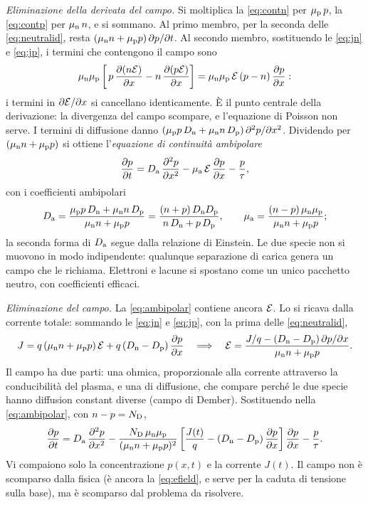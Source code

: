 \documentclass[10pt,a4paper]{scrartcl}
\let\newcommand\pdvaluedefine
\newcommand{\Ef}{\mathcal{E}}                 %
\newcommand{\ND}{N_\mathrm{D}}
\newcommand{\Da}{D_\mathrm{a}}
\newcommand{\Dn}{D_\mathrm{n}}
\newcommand{\Dp}{D_\mathrm{p}}
\newcommand{\mun}{\mu_\mathrm{n}}
\newcommand{\mup}{\mu_\mathrm{p}}
\newcommand{\dpar}[2]{\frac{\partial #1}{\partial #2}}
\newcommand{\dparq}[2]{\frac{\partial^2 #1}{\partial #2^2}}
\begin{document}
\emph{Eliminazione della derivata del campo.} Si moltiplica la \eqref{eq:contn} per $\mup\,p$, la \eqref{eq:contp} per $\mun\,n$, e si sommano. Al primo membro, per la seconda delle \eqref{eq:neutralid}, resta $(\mun n + \mup p)\,\partial p/\partial t$. Al secondo membro, sostituendo le \eqref{eq:jn} e \eqref{eq:jp}, i termini che contengono il campo sono
\begin{equation}
\mun\mup\left[\,p\,\dpar{(n\Ef)}{x} - n\,\dpar{(p\Ef)}{x}\right] = \mun\mup\,\Ef\,(p - n)\,\dpar{p}{x} :
\end{equation}
i termini in $\partial\Ef/\partial x$ si cancellano identicamente. È il punto centrale della derivazione: la divergenza del campo scompare, e l'equazione di Poisson non serve. I termini di diffusione danno $(\mup p\,\Dn + \mun n\,\Dp)\,\partial^2 p/\partial x^2$. Dividendo per $(\mun n + \mup p)$ si ottiene l'\emph{equazione di continuità ambipolare}
\begin{equation}
\dpar{p}{t} = \Da\,\dparq{p}{x} - \mu_\mathrm{a}\,\Ef\,\dpar{p}{x} - \frac{p}{\tau} ,
\label{eq:ambipolar}
\end{equation}
con i coefficienti ambipolari
\begin{equation}
\Da = \frac{\mup p\,\Dn + \mun n\,\Dp}{\mun n + \mup p} = \frac{(n+p)\,\Dn\Dp}{n\,\Dn + p\,\Dp} , \qquad
\mu_\mathrm{a} = \frac{(n-p)\,\mun\mup}{\mun n + \mup p} ;
\label{eq:dacoef}
\end{equation}
la seconda forma di $\Da$ segue dalla relazione di Einstein. Le due specie non si muovono in modo indipendente: qualunque separazione di carica genera un campo che le richiama. Elettroni e lacune si spostano come un unico pacchetto neutro, con coefficienti efficaci.

\emph{Eliminazione del campo.} La \eqref{eq:ambipolar} contiene ancora $\Ef$. Lo si ricava dalla corrente totale: sommando le \eqref{eq:jn} e \eqref{eq:jp}, con la prima delle \eqref{eq:neutralid},
\begin{equation}
J = q\,(\mun n + \mup p)\,\Ef + q\,(\Dn - \Dp)\,\dpar{p}{x}
\quad\Longrightarrow\quad
\Ef = \frac{J/q - (\Dn - \Dp)\,\partial p/\partial x}{\mun n + \mup p} .
\label{eq:efield}
\end{equation}
Il campo ha due parti: una ohmica, proporzionale alla corrente attraverso la conducibilità del plasma, e una di diffusione, che compare perché le due specie hanno diffusion constant diverse (campo di Dember). Sostituendo nella \eqref{eq:ambipolar}, con $n - p = \ND$,
\begin{equation}
\dpar{p}{t} = \Da\,\dparq{p}{x}
- \frac{\ND\,\mun\mup}{(\mun n + \mup p)^2}\left[\frac{J(t)}{q} - (\Dn - \Dp)\,\dpar{p}{x}\right]\dpar{p}{x}
- \frac{p}{\tau} .
\label{eq:ambipolarj}
\end{equation}
Vi compaiono solo la concentrazione $p(x,t)$ e la corrente $J(t)$. Il campo non è scomparso dalla fisica (è ancora la \eqref{eq:efield}, e serve per la caduta di tensione sulla base), ma è scomparso dal problema da risolvere.
\end{document}
